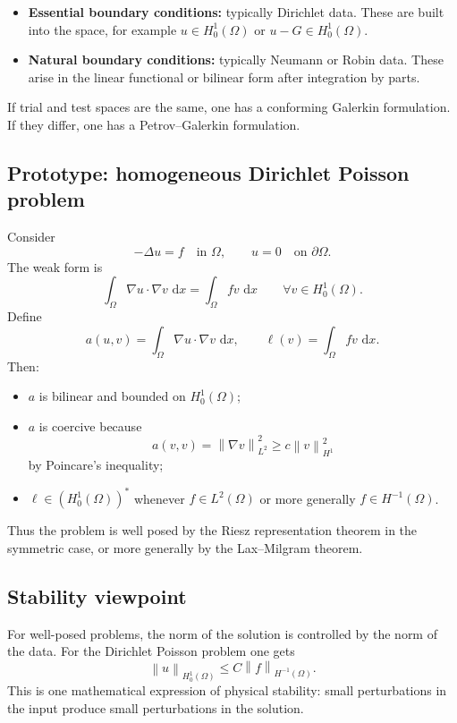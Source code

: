 \documentclass[11pt]{article}
\theoremstyle{definition}
\newcommand{\grad}{\nabla}
\newcommand{\dd}{\,\mathrm{d}}
\newcommand{\norm}[1]{\left\lVert #1\right\rVert}
\begin{document}
\begin{itemize}
    \item \textbf{Essential boundary conditions:} typically Dirichlet data. These are built into the space, for example $u\in H_0^1(\Omega)$ or $u-G\in H_0^1(\Omega)$.
    \item \textbf{Natural boundary conditions:} typically Neumann or Robin data. These arise in the linear functional or bilinear form after integration by parts.
\end{itemize}

If trial and test spaces are the same, one has a conforming Galerkin formulation. If they differ, one has a Petrov--Galerkin formulation.

\subsection{Prototype: homogeneous Dirichlet Poisson problem}

Consider
\[
-\Delta u=f \quad \text{in } \Omega,\qquad u=0 \quad \text{on } \partial\Omega.
\]
The weak form is
\[
\int_\Omega \grad u\cdot\grad v\,\dd x = \int_\Omega fv\,\dd x
\qquad \forall v\in H_0^1(\Omega).
\]
Define
\[
a(u,v)=\int_\Omega \grad u\cdot\grad v\,\dd x,
\qquad
\ell(v)=\int_\Omega fv\,\dd x.
\]
Then:
\begin{itemize}
    \item $a$ is bilinear and bounded on $H_0^1(\Omega)$;
    \item $a$ is coercive because
    \[
    a(v,v)=\norm{\grad v}_{L^2}^2 \ge c\norm{v}_{H^1}^2
    \]
    by Poincare's inequality;
    \item $\ell\in (H_0^1(\Omega))^*$ whenever $f\in L^2(\Omega)$ or more generally $f\in H^{-1}(\Omega)$.
\end{itemize}

Thus the problem is well posed by the Riesz representation theorem in the symmetric case, or more generally by the Lax--Milgram theorem.

\subsection{Stability viewpoint}

For well-posed problems, the norm of the solution is controlled by the norm of the data. For the Dirichlet Poisson problem one gets
\[
\norm{u}_{H_0^1(\Omega)} \le C\norm{f}_{H^{-1}(\Omega)}.
\]
This is one mathematical expression of physical stability: small perturbations in the input produce small perturbations in the solution.
\end{document}
